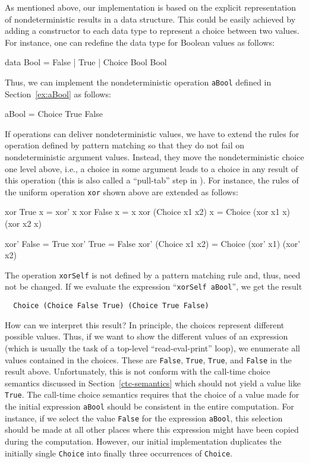 \documentclass{llncs}
\newcommand{\code}[1]{\mbox{\small\texttt{#1}}}
\newcommand{\ccode}[1]{``\code{#1}''}
\begin{document}
As mentioned above, our implementation is based on the explicit
representation of nondeterministic results in a data structure.
This could be easily achieved by adding a constructor
to each data type to represent a choice between two values.
For instance, one can redefine the data type for Boolean values
as follows:
\begin{haskell}
  data Bool = False | True | Choice Bool Bool
\end{haskell}
Thus, we can implement the nondeterministic operation \code{aBool}
defined in Section~\ref{ex:aBool} as follows:
\begin{haskell}
  aBool = Choice True False
\end{haskell}
If operations can deliver nondeterministic values,
we have to extend the rules for operation defined by
pattern matching so that they do not fail on nondeterministic argument
values. Instead, they move the nondeterministic choice one level above,
i.e., a choice in some argument leads to a choice in any result
of this operation (this is also called a ``pull-tab'' step in
\cite{AlqaddoumiAntoyFischerReck10}). For instance,
the rules of the uniform operation \code{xor} shown above
are extended as follows:
%
\begin{curry}
  xor True           x = xor' x
  xor False          x = x
  xor (Choice x1 x2) x = Choice (xor x1 x) (xor x2 x)

  xor' False          = True
  xor' True           = False
  xor' (Choice x1 x2) = Choice (xor' x1) (xor' x2)
\end{curry}
%
The operation \code{xorSelf} is not defined by a pattern matching rule
and, thus, need not be changed.
If we evaluate the expression \ccode{xorSelf aBool}, we get the result
\begin{lstlisting}
  Choice (Choice False True) (Choice True False)
\end{lstlisting}
How can we interpret this result?
In principle, the choices represent different possible values.
Thus, if we want to show the different values of an expression
(which is usually the task of a top-level ``read-eval-print'' loop),
we enumerate all values contained in the choices.
These are \code{False}, \code{True}, \code{True}, and \code{False}
in the result above.
Unfortunately, this is not conform with the call-time choice semantics
discussed in Section~\ref{ctc-semantics} which should not yield
a value like \code{True}.
The call-time choice semantics requires that the choice
of a value made for
the initial expression \code{aBool} should be consistent
in the entire computation.
For instance, if we select the value \code{False} for the
expression \code{aBool}, this selection should be made
at all other places where this expression might have been copied
during the computation. However, our initial implementation
duplicates the initially single \code{Choice} into finally three
occurrences of \code{Choice}.
\end{document}

